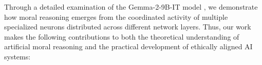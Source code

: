 






Through a detailed examination of the Gemma-2-9B-IT model \cite{Gemma2024}, we demonstrate how moral reasoning emerges from the coordinated activity of multiple specialized neurons distributed across different network layers.
Thus, our work makes the following contributions to both the theoretical understanding of artificial moral reasoning and the practical development of ethically aligned AI systems:

